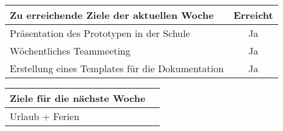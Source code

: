 \begin{tabularx}{\textwidth}{Xc}
    \arrayrulecolor{OliveGreen}
    \toprule
    {\bfseries Zu erreichende Ziele der aktuellen Woche} & {\bfseries Erreicht} \\
    \midrule[2pt]
    Präsentation des Prototypen in der Schule           &Ja                     \\
    \rowcolor{OliveGreen!15}
    Wöchentliches Teammeeting                           &Ja                     \\
    \rowcolor{White}
    Erstellung eines Templates für die Dokumentation    &Ja                     \\
    \bottomrule[2pt]
\end{tabularx}
%
\vspace{1cm}
%
\begin{tabularx}{\textwidth}{Xc}
    \arrayrulecolor{OliveGreen}
    \toprule
    {\bfseries Ziele für die nächste Woche}              &                      \\
    \midrule[2pt]
    Urlaub + Ferien                                      &                      \\
\end{tabularx}
